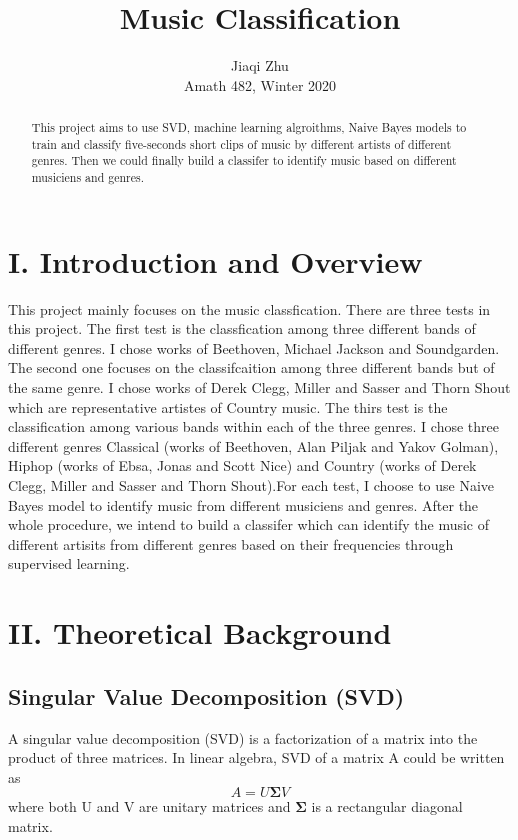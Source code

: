 \documentclass[12pt,letterpaper]{article}
\author{Jiaqi Zhu \\Amath 482, Winter 2020}
\title{Music Classification}
\begin{document}
\maketitle
\begin{abstract}
This project aims to use SVD, machine learning algroithms, Naive Bayes models to train and classify five-seconds short clips of music by different artists of different genres. Then we could finally build a classifer to identify music based on different musiciens and genres. 
\end{abstract}

\section*{I. Introduction and Overview}
This project mainly focuses on the music classfication. There are three tests in this project. The first test is the classfication among three different bands of different genres. I chose works of Beethoven, Michael Jackson and Soundgarden. The second one focuses on the classifcaition among three different bands but of the same genre. I chose works of Derek Clegg, Miller and Sasser and Thorn Shout which are representative artistes of Country music. The thirs test is the classification among various bands within each of the three genres.  I chose three different genres Classical (works of Beethoven, Alan Piljak and Yakov Golman), Hiphop (works of Ebsa, Jonas and Scott Nice) and Country (works of Derek Clegg, Miller and Sasser and Thorn Shout).For each test, I choose to use Naive Bayes model to identify music from different musiciens and genres. After the whole procedure, we intend to build a classifer which can identify the music of different artisits from different genres based on their frequencies through supervised learning. 

\section*{II. Theoretical Background}
\subsection*{Singular Value Decomposition (SVD)}
A singular value decomposition (SVD) is a factorization of a matrix into the product of three matrices. In linear algebra, SVD of a matrix A could be written as 
\begin{equation}
A = U\mathbf{\Sigma}V
\end{equation}
where both U and V are unitary matrices and $\mathbf{\Sigma}$ is a rectangular diagonal matrix. 
\end{document}
